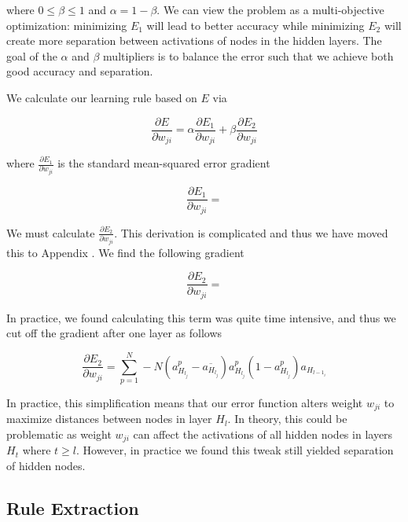 where $0 \leq \beta \leq 1$ and $\alpha = 1 - \beta$.
We can view the problem as a multi-objective optimization:
minimizing $E_1$ will lead to better accuracy while
minimizing $E_2$ will create more separation between activations of
nodes in the hidden layers. The goal of the $\alpha$ and $\beta$
multipliers is to balance the error such that we achieve
both good accuracy and separation.

We calculate our learning rule based on $E$ via

\begin{equation}
  \frac{\partial E}{\partial w_{ji}} = \alpha \frac{\partial E_1}{\partial w_{ji}} + \beta \frac{\partial E_2}{\partial w_{ji}}
\end{equation}

where $\frac{\partial E_1}{\partial w_{ji}}$ is the standard mean-squared error gradient

\begin{equation}
  \frac{\partial E_1}{\partial w_{ji}} = 
\end{equation}

We must calculate $\frac{\partial E_2}{\partial w_{ji}}$. This derivation is
complicated and thus we have moved this to Appendix
.
We find the following gradient

\begin{equation}
  \frac{\partial E_2}{\partial w_{ji}} = 
\end{equation}

In practice, we found calculating this term was quite time intensive, and thus
we cut off the gradient after one layer as follows

\begin{equation}
  \frac{\partial E_2}{\partial w_{ji}} = \sum_{p=1}^{N} -N(a_{H_{l_j}}^p - \overline{a_{H_{l_j}}})a_{H_{l_j}}^p(1-a_{H_{l_j}}^p)a_{H_{l-1_i}}
\end{equation}

In practice, this simplification means that our error function alters weight
$w_{ji}$ to maximize distances between nodes in layer $H_{l}$. In theory, this
could be problematic as weight $w_{ji}$ can affect the activations of all
hidden nodes in layers $H_{t}$ where $t \geq l$. However, in practice we
found this tweak still yielded separation of hidden nodes.

\subsection{Rule Extraction}
\label{sec:re}

